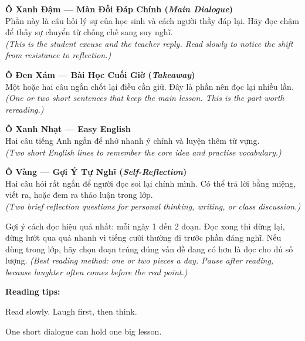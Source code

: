 \begin{tcolorbox}[
  colback=paperwarm,
  colframe=dustrose,
  coltitle=black,
  fonttitle=\bfseries,
  title={Giải Thích Các Ô Trong Sách \quad\textit{\small(Book Guide)}},
  arc=6pt, boxrule=1pt, breakable, enhanced
]

\smallskip
\textbf{Ô Xanh Đậm --- Màn Đối Đáp Chính (\textit{Main Dialogue})}\\
Phần này là câu hỏi lý sự của học sinh và cách người thầy đáp lại. Hãy đọc chậm để thấy sự chuyển từ chống chế sang suy nghĩ.\\
\textit{(This is the student excuse and the teacher reply. Read slowly to notice the shift from resistance to reflection.)}

\medskip
\textbf{Ô Đen Xám --- Bài Học Cuối Giờ (\textit{Takeaway})}\\
Một hoặc hai câu ngắn chốt lại điều cần giữ. Đây là phần nên đọc lại nhiều lần.\\
\textit{(One or two short sentences that keep the main lesson. This is the part worth rereading.)}

\medskip
\textbf{Ô Xanh Nhạt --- Easy English}\\
Hai câu tiếng Anh ngắn để nhớ nhanh ý chính và luyện thêm từ vựng.\\
\textit{(Two short English lines to remember the core idea and practise vocabulary.)}

\medskip
\textbf{Ô Vàng --- Gợi Ý Tự Nghĩ (\textit{Self-Reflection})}\\
Hai câu hỏi rất ngắn để người đọc soi lại chính mình. Có thể trả lời bằng miệng, viết ra, hoặc đem ra thảo luận trong lớp.\\
\textit{(Two brief reflection questions for personal thinking, writing, or class discussion.)}

\smallskip
\end{tcolorbox}

\vspace{6pt}

\begin{baihoc}
Gợi ý cách đọc hiệu quả nhất: mỗi ngày 1 đến 2 đoạn. Đọc xong thì dừng lại, đừng lướt qua quá nhanh vì tiếng cười thường đi trước phần đáng nghĩ. Nếu dùng trong lớp, hãy chọn đoạn trúng đúng vấn đề đang có hơn là đọc cho đủ số lượng.
\textit{(Best reading method: one or two pieces a day. Pause after reading, because laughter often comes before the real point.)}
\end{baihoc}

\begin{ghinhoanh}
\textbf{Reading tips:}

Read slowly. Laugh first, then think.

One short dialogue can hold one big lesson.
\end{ghinhoanh}

\ngancach